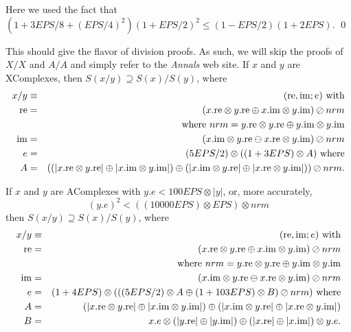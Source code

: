 Here we used the fact that 
\hfill $(1 + 3EPS/8 + (EPS/4)^2)(1+EPS/2)^2 \le (1 - EPS/2)(1+ 2EPS).$ \hfill\qed
{}
 
This should give the flavor of division proofs.  As such, we will skip the proofs of $X/X$ and $A/A$ and simply refer to the
 {\it Annals} web site.
If $x$ and $y$ are {\rm XComplexes,} then
$S(x / y) \supseteq S(x) / S(y)${\rm ,} where
\begin{eqnarray*}
x  / y  &\equiv& ({\rm re},{\rm im};e)\hbox{ with}\\
{\rm re}& =& (x.{\rm re} \otimes y.{\rm re} \oplus x.{\rm im} \otimes y.{\rm im}) \oslash nrm\\
&&\hbox{ where $nrm = y.{\rm
re}
\otimes y.{\rm re} \oplus y.{\rm im} \otimes y.{\rm im}$}\\
{\rm im}& = &(x.{\rm im} \otimes y.{\rm re} \ominus x.{\rm re} \otimes y.{\rm im}) \oslash nrm\\
e& =& (5EPS/2) \otimes ((1
+  3EPS) \otimes A) \hbox{  where}\\
 A& =& 
((|x.{\rm re} \otimes y.{\rm re}| \oplus |x.{\rm im} \otimes y.{\rm im}|)
 \oplus 
 (|x.{\rm im} \otimes y.{\rm re}| \oplus |x.{\rm re} \otimes y.{\rm im}|))
\oslash nrm
.\end{eqnarray*}
\endproclaim

If $x$ and $y$ are {\rm AComplexes} with 
$y.e < 100 EPS \otimes |y|${\rm ,} or{\rm ,} more accurately{\rm , }
$$(y.e)^2< ((10000 EPS) \otimes EPS)\otimes nrm$$ then
$S(x / y) \supseteq S(x) / S(y)${\rm ,} where
\begin{eqnarray*}
x  / y & \equiv& ({\rm re},{\rm im};e)\hbox{ with}\\
{\rm re}& =& (x.{\rm re} \otimes y.{\rm re} \oplus x.{\rm im} \otimes y.{\rm im}) \oslash nrm\\
&&\hbox{ where $nrm = y.{\rm
re}
\otimes y.{\rm re} \oplus y.{\rm im} \otimes y.{\rm im}$}\\
{\rm im}& =& (x.{\rm im} \otimes y.{\rm re} \ominus x.{\rm re} \otimes y.{\rm im}) \oslash nrm\\
e& =& (1 + 4EPS)\otimes 
(
((5 EPS/2) \otimes A \oplus (1+103EPS) \otimes B)
\oslash nrm)\hbox{ where}\\
 A& =& (|x.{\rm re} \otimes y.{\rm re}| \oplus |x.{\rm im}\otimes y.{\rm im}|) 
 \oplus
(|x.{\rm im} \otimes y.{\rm re}| \oplus | x.{\rm re} \otimes y.{\rm im}|)\\
B& =& x.e\otimes(|y.{\rm re}|\oplus|y.{\rm im}|)
\oplus
   (|x.{\rm re}|\oplus|x.{\rm im}|)\otimes y.e.
\end{eqnarray*}
\endproclaim

